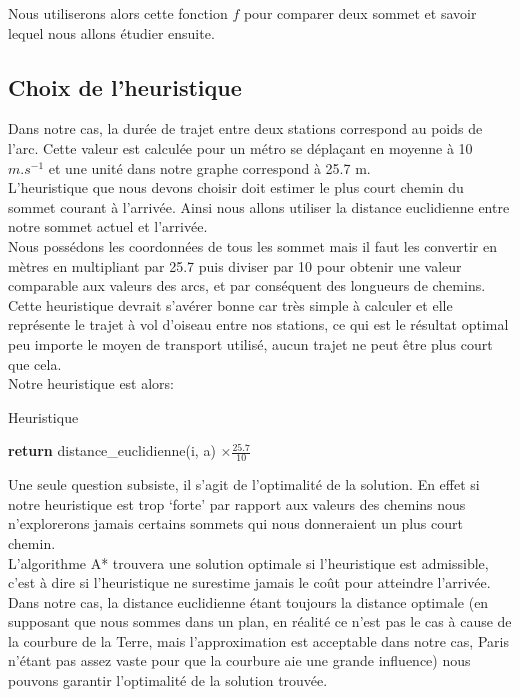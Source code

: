 \documentclass{article}
\begin{document}
Nous utiliserons alors cette fonction $f$ pour comparer deux sommet et savoir lequel
nous allons étudier ensuite.

\subsection{Choix de l'heuristique}

Dans notre cas, la durée de trajet entre deux stations correspond au poids de l'arc. Cette valeur
est calculée pour un métro se déplaçant en moyenne à 10 $m.s^{-1}$ et une unité dans notre graphe
correspond à 25.7 m.\\

L'heuristique que nous devons choisir doit estimer le plus court chemin du sommet courant à l'arrivée.
Ainsi nous allons utiliser la distance euclidienne entre notre sommet actuel et l'arrivée.\\
Nous possédons les coordonnées de tous les sommet mais il faut les convertir en mètres en multipliant
par 25.7 puis diviser par 10 pour obtenir une valeur comparable aux valeurs des arcs, et par 
conséquent des longueurs de chemins.\\
Cette heuristique devrait s'avérer bonne car très simple à calculer et elle représente le trajet à
vol d'oiseau entre nos stations, ce qui est le résultat optimal peu importe le moyen de transport
utilisé, aucun trajet ne peut être plus court que cela.\\

Notre heuristique est alors:

\begin{algorithm}
\caption{Heuristique}\label{heuristique}
\begin{algorithmic}[1]
 
	\State \textbf{return} distance\_euclidienne(i, a) $\times \frac{25.7}{10}$
\EndProcedure
\end{algorithmic}
\end{algorithm}

Une seule question subsiste, il s'agit de l'optimalité de la solution. En effet si notre heuristique
est trop `forte' par rapport aux valeurs des chemins nous n'explorerons jamais certains sommets
qui nous donneraient un plus court chemin.\\
L'algorithme A* trouvera une solution optimale si l'heuristique est admissible, c'est à dire si
l'heuristique ne surestime jamais le coût pour atteindre l'arrivée.\\
Dans notre cas, la distance euclidienne étant toujours la distance optimale (en supposant que nous sommes
dans un plan, en réalité ce n'est pas le cas à cause de la courbure de la Terre, mais l'approximation
est acceptable dans notre cas, Paris n'étant pas assez vaste pour que la courbure aie une grande influence)
nous pouvons garantir l'optimalité de la solution trouvée.\\\\
\end{document}

